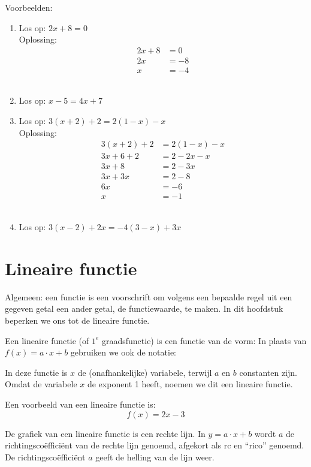 Voorbeelden:
\begin{enumerate}
    \itemsep1em
    \item Los op: $2x+8=0$ \\
            Oplossing: 	
            \begin{align*}
                2x+8    &=0 \\
                2x      &=-8 \\
                x       &=-4
            \end{align*} \\
	\item Los op: $x-5=4x+7$
	\item Los op: $3(x+2)+2=2(1-x)-x$ \\
        Oplossing: 	
        \begin{align*}
        3(x+2)+2  &= 2(1-x)-x \\
        3x+6+2    &= 2-2x-x  \\
        3x+8      &=2-3x \\
        3x+3x     &=2-8  \\
        6x        &=-6 \\
        x         &=-1
        \end{align*} \\
	\item Los op: $3(x-2)+2x=-4(3-x)+3x$
\end{enumerate}

\section{Lineaire functie}
Algemeen: een functie is een voorschrift om volgens een bepaalde regel uit een gegeven getal een ander getal, de functiewaarde, te maken. In dit hoofdstuk beperken we ons tot de lineaire functie.

Een lineaire functie (of $1^e$ graadsfunctie) is een functie van de vorm: 	
In plaats van $f(x)=a\cdot x+b$ gebruiken we ook de notatie:

In deze functie is $x$ de (onafhankelijke) variabele, terwijl $a$ en $b$ constanten zijn. Omdat de variabele $x$ de exponent 1 heeft, noemen we dit een lineaire functie.

Een voorbeeld van een lineaire functie is: 
\[
    f(x)=2x-3
\]

De grafiek van een lineaire functie is een rechte lijn.
In $y=a\cdot x+b$ wordt $a$ de richtingsco\"effici\"ent van de rechte lijn genoemd, afgekort als rc en ``rico'' genoemd. De richtingsco\"effici\"ent $a$ geeft de helling van de lijn weer.\\

